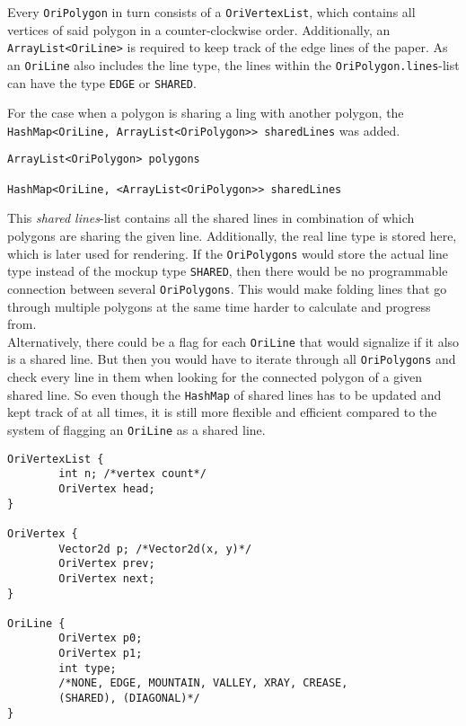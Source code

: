 Every \texttt{OriPolygon} in turn consists of a \texttt{OriVertexList}, which contains all vertices of said polygon in a counter-clockwise order. Additionally, an \texttt{ArrayList<OriLine>} is required to keep track of the edge lines of the paper. As an \texttt{OriLine} also includes the line type, the lines within the \texttt{OriPolygon.lines}-list can have the type \texttt{EDGE} or \texttt{SHARED}.

For the case when a polygon is sharing a ling with another polygon, the \texttt{HashMap<OriLine, ArrayList<OriPolygon>> sharedLines} was added.

\begin{lstlisting}[label=paperModelImplementation,caption=New Implementation of Paper Model]
ArrayList<OriPolygon> polygons

HashMap<OriLine, <ArrayList<OriPolygon>> sharedLines
\end{lstlisting}

This \emph{shared lines}-list contains all the shared lines in combination of which polygons are sharing the given line. Additionally, the real line type is stored here, which is later used for rendering. If the \texttt{OriPolygons} would store the actual line type instead of the mockup type \texttt{SHARED}, then there would be no programmable connection between several \texttt{OriPolygons}. This would make folding lines that go through multiple polygons at the same time harder to calculate and progress from.\\

Alternatively, there could be a flag for each \texttt{OriLine} that would signalize if it also is a shared line. But then you would have to iterate through all \texttt{OriPolygons} and check every line in them when looking for the connected polygon of a given shared line. So even though the \texttt{HashMap} of shared lines has to be updated and kept track of at all times, it is still more flexible and efficient compared to the system of flagging an \texttt{OriLine} as a shared line.

\begin{lstlisting}[label=oriVertexList,caption={OriVertexList, OriVertex, and OriLine}]
OriVertexList {
        int n; /*vertex count*/
        OriVertex head;
}

OriVertex {
        Vector2d p; /*Vector2d(x, y)*/
        OriVertex prev;
        OriVertex next;
}

OriLine {
        OriVertex p0;
        OriVertex p1;
        int type; 
        /*NONE, EDGE, MOUNTAIN, VALLEY, XRAY, CREASE, 
        (SHARED), (DIAGONAL)*/
}
\end{lstlisting}

